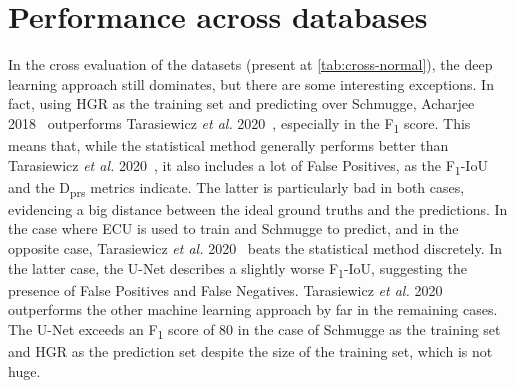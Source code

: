 \FloatBarrier
\section{Performance across databases}

In the cross evaluation of the datasets (present at \autoref{tab:cross-normal}), the deep learning approach still dominates, but there are some interesting exceptions.
In fact, using HGR as the training set and predicting over Schmugge, Acharjee 2018~\cite{acharjee2018skin} outperforms Tarasiewicz \textit{et al.} 2020~\cite{tarasiewicz2020skinny}, especially in the F\textsubscript{1} score.
This means that, while the statistical method generally performs better than Tarasiewicz \textit{et al.} 2020~\cite{tarasiewicz2020skinny}, it also includes a lot of False Positives, as the F\textsubscript{1}-IoU and the D\textsubscript{prs} metrics indicate.
The latter is particularly bad in both cases, evidencing a big distance between the ideal ground truths and the predictions.
In the case where ECU is used to train and Schmugge to predict, and in the opposite case, Tarasiewicz \textit{et al.} 2020~\cite{tarasiewicz2020skinny} beats the statistical method discretely.
In the latter case, the U-Net describes a slightly worse F\textsubscript{1}-IoU, suggesting the presence of False Positives and False Negatives.
Tarasiewicz \textit{et al.} 2020~\cite{tarasiewicz2020skinny} outperforms the other machine learning approach by far in the remaining cases.
The U-Net exceeds an F\textsubscript{1} score of 80 in the case of Schmugge as the training set and HGR as the prediction set despite the size of the training set, which is not huge.

